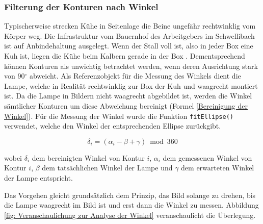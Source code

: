 \subsubsection{Filterung der Konturen nach Winkel}
Typischerweise strecken Kühe in Seitenlage die Beine ungefähr rechtwinklig vom Körper weg. Die Infrastruktur vom Bauernhof des Arbeitgebers im Schwellibach ist auf Anbindehaltung ausgelegt. Wenn der Stall voll ist, also in jeder Box eine Kuh ist, liegen die Kühe beim Kalbern gerade in der Box \citep{Muller2020b}. Dementsprechend können Konturen als unwichtig betrachtet werden, wenn deren Ausrichtung stark von 90$^{\circ}$  abweicht. Als Referenzobjekt für die Messung des Winkels dient die Lampe, welche in Realität rechtwinklig zur Box der Kuh und waagrecht montiert ist. Da die Lampe in Bildern nicht waagrecht abgebildet ist, werden die Winkel sämtlicher Konturen um diese Abweichung bereinigt (Formel \ref{Bereinigung der Winkel}). Für die Messung der Winkel wurde die Funktion \texttt{fitEllipse()} verwendet, welche den Winkel der entsprechenden Ellipse zurückgibt.

\begin{equation}\label{Bereinigung der Winkel}
\delta_{i} = (\alpha_{i} - \beta + \gamma) \bmod 360
\end{equation}

wobei $ \delta_{i} $ dem bereinigten Winkel von Kontur ${i}$,  $ \alpha_{i} $ dem gemessenen Winkel von Kontur ${i}$, $\beta$ dem tatsächlichen Winkel der Lampe und $\gamma$ dem erwarteten Winkel der Lampe entspricht.


Das Vorgehen gleicht grundsätzlich dem Prinzip, das Bild solange zu drehen, bis die Lampe waagrecht im Bild ist und erst dann die Winkel zu messen. Abbildung \ref{fig: Veranschaulichung zur Analyse der Winkel} veranschaulicht die Überlegung. 


